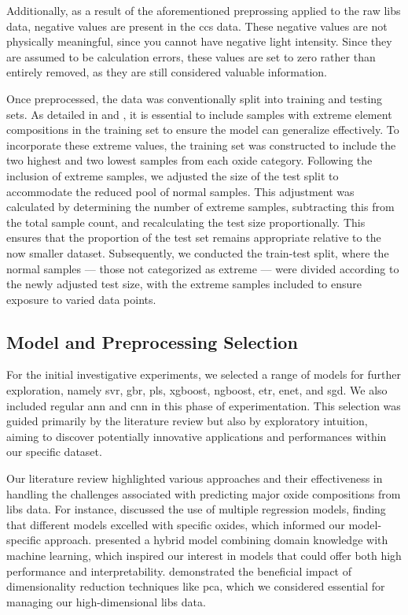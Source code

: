 Additionally, as a result of the aforementioned preprossing applied to the raw \gls{libs} data, negative values are present in the \gls{ccs} data.
These negative values are not physically meaningful, since you cannot have negative light intensity. Since they are assumed to be calculation errors, these values are set to zero rather than entirely removed, as they are still considered valuable information.

Once preprocessed, the data was conventionally split into training and testing sets. 
As detailed in \citet{p9_paper} and \citet{cleggRecalibrationMarsScience2017}, it is essential to include samples with extreme element compositions in the training set to ensure the model can generalize effectively.
To incorporate these extreme values, the training set was constructed to include the two highest and two lowest samples from each oxide category.
Following the inclusion of extreme samples, we adjusted the size of the test split to accommodate the reduced pool of normal samples.
This adjustment was calculated by determining the number of extreme samples, subtracting this from the total sample count, and recalculating the test size proportionally. 
This ensures that the proportion of the test set remains appropriate relative to the now smaller dataset. 
Subsequently, we conducted the train-test split, where the normal samples --- those not categorized as extreme --- were divided according to the newly adjusted test size, with the extreme samples included to ensure exposure to varied data points.

\subsection{Model and Preprocessing Selection}
For the initial investigative experiments, we selected a range of models for further exploration, namely \gls{svr}, \gls{gbr}, \gls{pls}, \gls{xgboost}, \gls{ngboost}, \gls{etr}, \gls{enet}, and \gls{sgd}.
We also included regular \gls{ann} and \gls{cnn} in this phase of experimentation. 
This selection was guided primarily by the literature review but also by exploratory intuition, aiming to discover potentially innovative applications and performances within our specific dataset.

Our literature review highlighted various approaches and their effectiveness in handling the challenges associated with predicting major oxide compositions from \gls{libs} data. 
For instance, \citet{andersonImprovedAccuracyQuantitative2017} discussed the use of multiple regression models, finding that different models excelled with specific oxides, which informed our model-specific approach. 
\citet{song_DF-K-ELM} presented a hybrid model combining domain knowledge with machine learning, which inspired our interest in models that could offer both high performance and interpretability. \citet{rezaei_dimensionality_reduction} demonstrated the beneficial impact of dimensionality reduction techniques like \gls{pca}, which we considered essential for managing our high-dimensional \gls{libs} data.

